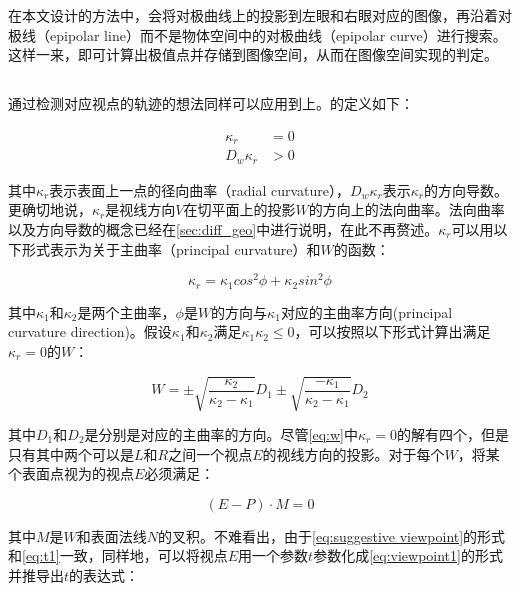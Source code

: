 在本文设计的方法中，会将对极曲线上的\conp{}投影到左眼和右眼对应的图像，再沿着对极线（epipolar line）而不是物体空间中的对极曲线（epipolar curve）进行搜索。这样一来，即可计算出极值点并存储到图像空间，从而在图像空间实现\epsl{}的判定。

\subsection{\scon{}}
\label{sec:suggestive_contour_math}
通过检测对应视点的轨迹的想法同样可以应用到\scon{}上。\scon{}的定义如下：

\begin{align}
  \kappa_r &= 0 \label{eq:Kr} \\
  D_w\kappa_r &> 0 \label{eq:DwKr} 
\end{align}

其中$\kappa_r$表示表面上一点的径向曲率（radial curvature），$D_w\kappa_r$表示$\kappa_r$的方向导数。更确切地说，$\kappa_r$是视线方向$V$在切平面上的投影$W$的方向上的法向曲率。法向曲率以及方向导数的概念已经在\autoref{sec:diff_geo}中进行说明，在此不再赘述。$\kappa_r$可以用以下形式表示为关于主曲率（principal curvature）和$W$的函数：

\begin{equation}\label{eq:normal curvature}
    \kappa_r = \kappa_1cos^2\phi+\kappa_2sin^2\phi
\end{equation}

其中$\kappa_1$和$\kappa_2$是两个主曲率，$\phi$是$W$的方向与$\kappa_1$对应的主曲率方向(principal curvature direction)。假设$\kappa_1$和$\kappa_2$满足$\kappa_1\kappa_2 \leq 0$，可以按照以下形式计算出满足$\kappa_r = 0$的$W$：

\begin{equation}\label{eq:w}
    W = \pm\sqrt{\frac{\kappa_2}{\kappa_2-\kappa_1}}D_1\pm\sqrt{\frac{-\kappa_1}{\kappa_2-\kappa_1}}D_2
\end{equation}

其中$D_1$和$D_2$是分别是对应的主曲率的方向。尽管\autoref{eq:w}中$\kappa_r = 0$的解有四个，但是只有其中两个可以是$L$和$R$之间一个视点$E$的视线方向的投影。对于每个$W$，将某个表面点视为\sconp{}的视点$E$必须满足：

\begin{equation}\label{eq:suggestive viewpoint}
    {(E - P)}\cdot{M} = 0
\end{equation}

其中$M$是$W$和表面法线$N$的叉积。不难看出，由于\autoref{eq:suggestive viewpoint}的形式和\autoref{eq:t1}一致，同样地，可以将视点$E$用一个参数$t$参数化成\autoref{eq:viewpoint1}的形式并推导出$t$的表达式：

